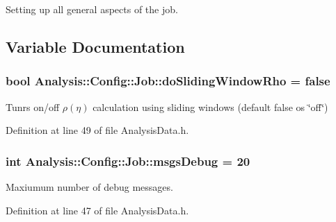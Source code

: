 Setting up all general aspects of the job. 

\subsection{Variable Documentation}
\subsubsection[{\texorpdfstring{do\+Sliding\+Window\+Rho}{doSlidingWindowRho}}]{\setlength{\rightskip}{0pt plus 5cm}bool Analysis\+::\+Config\+::\+Job\+::do\+Sliding\+Window\+Rho = false\hspace{0.3cm}{\ttfamily [static]}}\hypertarget{namespaceAnalysis_1_1Config_1_1Job_a745c1fecd2479d21b556bfb812e3805b}{}\label{namespaceAnalysis_1_1Config_1_1Job_a745c1fecd2479d21b556bfb812e3805b}


Tunrs on/off $ \rho(\eta) $ calculation using sliding windows (default {\ttfamily false} os \char`\"{}off\char`\"{}) 



Definition at line 49 of file Analysis\+Data.\+h.

\subsubsection[{\texorpdfstring{msgs\+Debug}{msgsDebug}}]{\setlength{\rightskip}{0pt plus 5cm}int Analysis\+::\+Config\+::\+Job\+::msgs\+Debug = 20\hspace{0.3cm}{\ttfamily [static]}}\hypertarget{namespaceAnalysis_1_1Config_1_1Job_a1cbee93d8fe720cde075eb23877eb114}{}\label{namespaceAnalysis_1_1Config_1_1Job_a1cbee93d8fe720cde075eb23877eb114}


Maxiumum number of debug messages. 



Definition at line 47 of file Analysis\+Data.\+h.

